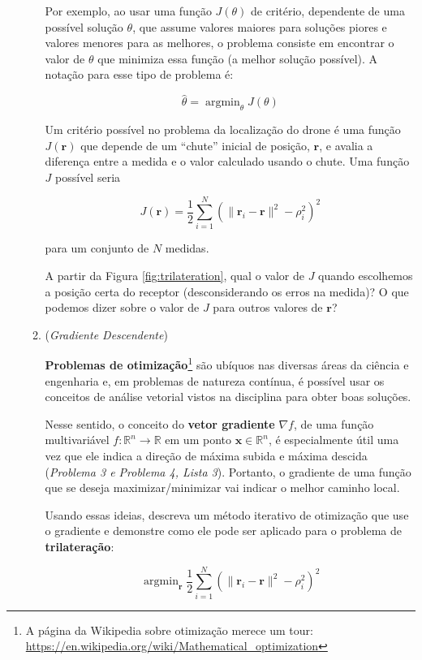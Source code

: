 \documentclass[9pt]{article}
\newcommand{\R}{\mathbb{R}}
\DeclareMathOperator*{\argmin}{argmin}
\begin{document}
\begin{enumerate}[label=$\blacktriangleright$ {\bf Exercício \arabic*},series=exerc,align=left]
\begin{enumerate}[label=(\alph*)]
    Por exemplo, ao usar uma função $J(\theta)$ de critério, dependente de uma possível solução $\theta$, que assume valores maiores para soluções piores e valores menores para as melhores, o problema consiste em encontrar o valor de $\theta$ que minimiza essa função (a melhor solução possível). A notação para esse tipo de problema é:

    $$\hat{\theta} = \argmin_\theta J(\theta)$$
    
    Um critério possível no problema da localização do drone é uma função $J(\mathbf{r})$ que depende de um ``chute'' inicial de posição, $\mathbf{r}$, e avalia a diferença entre a medida e o valor calculado usando o chute. Uma função $J$ possível seria

    $$J(\mathbf{r}) = \frac{1}{2}\sum_{i=1}^{N}\left(\|\mathbf{r}_i - \mathbf{r}\|^2 - \rho_i^2\right)^2$$

    para um conjunto de $N$ medidas. 
    
    A partir da Figura \ref{fig:trilateration}, qual o valor de $J$ quando escolhemos a posição certa do receptor (desconsiderando os erros na medida)? O que podemos dizer sobre o valor de $J$ para outros valores de $\mathbf{r}$? 
    
    \item (\textit{Gradiente Descendente})

    \textbf{Problemas de otimização}\footnote{A página da Wikipedia sobre otimização merece um tour: \url{https://en.wikipedia.org/wiki/Mathematical_optimization}} são ubíquos nas diversas áreas da ciência e engenharia e, em problemas de natureza contínua, é possível usar os conceitos de análise vetorial vistos na disciplina para obter boas soluções.

    Nesse sentido, o conceito do \textbf{vetor gradiente} $\nabla f$, de uma função multivariável $f: \R^n \to \R$ em um ponto $\mathbf{x}\in \R^n$, é especialmente útil uma vez que ele indica a direção de máxima subida e máxima descida (\textit{Problema 3 e Problema 4, Lista 3}). Portanto, o gradiente de uma função que se deseja maximizar/minimizar vai indicar o melhor caminho local.

    Usando essas ideias, descreva um método iterativo de otimização que use o gradiente e demonstre como ele pode ser aplicado para o problema de \textbf{trilateração}:

    $$\argmin_\mathbf{r} \frac{1}{2}\sum_{i=1}^{N}\left(\|\mathbf{r}_i - \mathbf{r}\|^2 - \rho_i^2\right)^2$$

\end{enumerate}

\end{enumerate}
\end{document}
